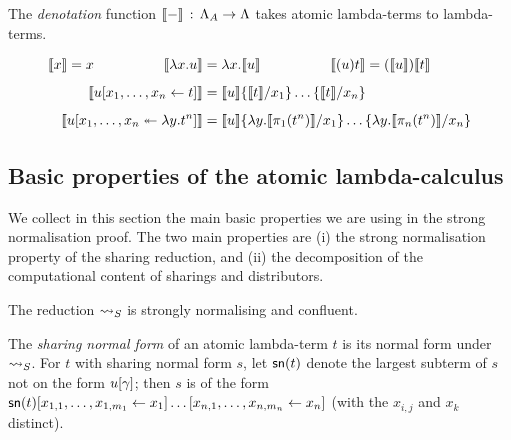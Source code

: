 \documentclass{llncs} %
\begin{document}
\noindent
The \emph{denotation} function ${\llbracket{-}\rrbracket}\,:\,\Lambda_A\to\Lambda$ takes atomic lambda-terms to lambda-terms.


\[
\begin{aligned}
		\terden{x} = x  
\quads5	\terden{\lambda x.u} &= \lambda x.\terden u  
\quads5 \terden{(u)t} = (\terden u)\terden t
\\[5pt]	
		\terden{u\share xt}  &= \terden u\subs x{\terden{t}}
\\[5pt]	\terden{u\distr xy{t^n}} &= \terden u\sub{x_1}{\lambda y.\terden{\pi_1(t^n)}}\dots\sub{x_n}{\lambda y.\terden{\pi_n(t^n)}}
\end{aligned}
\]


\subsection{Basic properties of the atomic lambda-calculus}
\label{ssec:basic properties}

We collect in this section the main basic properties we are using in the strong normalisation proof. The two main properties are (i) the strong normalisation property of the sharing reduction, and (ii) the  decomposition of the computational content of sharings and distributors.

\begin{theorem}
The reduction $\ALnotbeta$ is strongly normalising and confluent.
\end{theorem}

\noindent
The \emph{sharing normal form} of an atomic lambda-term $t$ is its normal form under $\ALnotbeta$.
% 
For $t$ with sharing normal form $s$, let ${\mathsf{sn}}(t)$ denote the largest subterm of $s$ not on the form $u\g$; then $s$ is of the form $\sn(t)\share*{x_{1,1},\dots,x_{1,m_1}}{x_1}\dots\share*{x_{n,1},\dots,x_{n,m_n}}{x_n}$ (with the $x_{i,j}$ and $x_k$ distinct).
\end{document}
